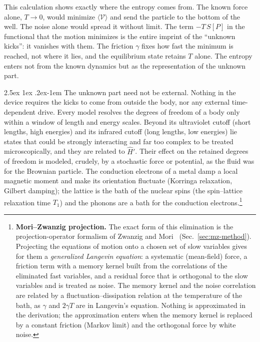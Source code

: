 \documentclass[10pt,a4paper]{article}
\makeatletter
\renewcommand{\paragraph}{\@startsection{paragraph}{4}{\z@}%
  {2.5ex \@plus 1ex \@minus .2ex}{-1em}%
  {\normalfont\fontsize{14pt}{17pt}\selectfont\bfseries}}
\makeatother
\begin{document}
This calculation shows exactly where the entropy comes from.
The known force alone, $ T \to 0 $, would minimize $ \langle\mathcal{V}\rangle $ and send the particle to the bottom of the well.
The noise alone would spread it without limit.
The term $ -T\,S[P] $ in the functional that the motion minimizes is the entire imprint of the ``unknown kicks'': it vanishes with them.
The friction $ \gamma $ fixes how fast the minimum is reached, not where it lies, and the equilibrium state retains $ T $ alone.
The entropy enters not from the known dynamics but as the representation of the unknown part.

\paragraph{The unknown part need not be external.}
Nothing in the device requires the kicks to come from outside the body, nor any external time-dependent drive.
Every model resolves the degrees of freedom of a body only within a window of length and energy scales.
Beyond its ultraviolet cutoff (short lengths, high energies) and its infrared cutoff (long lengths, low energies) lie states that could be strongly interacting and far too complex to be treated microscopically, and they are related to $ \hat H' $.
Their effect on the retained degrees of freedom is modeled, crudely, by a stochastic force or potential, as the fluid was for the Brownian particle.
The conduction electrons of a metal damp a local magnetic moment and make its orientation fluctuate (Korringa relaxation, Gilbert damping); the lattice is the bath of the nuclear spins (the spin--lattice relaxation time $ T_1 $) and the phonons are a bath for the conduction electrons.\footnote{\label{fn:morizwanzig}\textbf{Mori--Zwanzig projection.}
The exact form of this elimination is the projection-operator formalism of Zwanzig and Mori~\cite{Zwanzig1960,Mori1965} (Sec.~\ref{sec:mz-method}).
Projecting the equations of motion onto a chosen set of slow variables gives for them a \emph{generalized Langevin equation}: a systematic (mean-field) force, a friction term with a memory kernel built from the correlations of the eliminated fast variables, and a residual force that is orthogonal to the slow variables and is treated as noise.
The memory kernel and the noise correlation are related by a fluctuation--dissipation relation at the temperature of the bath, as $ \gamma $ and $ 2\gamma T $ are in Langevin's equation.
Nothing is approximated in the derivation; the approximation enters when the memory kernel is replaced by a constant friction (Markov limit) and the orthogonal force by white noise.}
\end{document}
